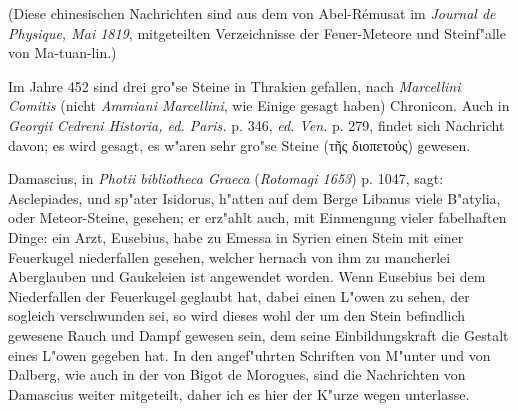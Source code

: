 \documentclass[a4paper, 11pt, oneside, polutonikogreek, german]{article}
\begin{document}
(Diese chinesischen Nachrichten sind aus dem von Abel-Rémusat im \emph{Journal de Physique, Mai 1819}, mitgeteilten Verzeichnisse der Feuer-Meteore und Steinf"alle von Ma-tuan-lin.)

Im Jahre 452 sind drei gro"se Steine in Thrakien gefallen, nach \emph{Marcellini Comitis} (nicht \emph{Ammiani Marcellini}, wie Einige gesagt haben) Chronicon. Auch in \emph{Georgii Cedreni Historia, ed. Paris.} p. 346, \emph{ed. Ven.} p. 279, findet sich Nachricht davon; es wird gesagt, es w"aren sehr gro"se Steine (τῆς διοπετοὑς) gewesen.

Damascius, in \emph{Photii bibliotheca Graeca} (\emph{Rotomagi 1653}) p. 1047, sagt: Asclepiades, und sp"ater Isidorus, h"atten auf dem Berge Libanus viele B"atylia, oder Meteor-Steine, gesehen; er erz"ahlt auch, mit Einmengung vieler fabelhaften Dinge: ein Arzt, Eusebius, habe zu Emessa in Syrien einen Stein mit einer Feuerkugel niederfallen gesehen, welcher hernach von ihm zu mancherlei Aberglauben und Gaukeleien ist angewendet worden. Wenn Eusebius bei dem Niederfallen der Feuerkugel geglaubt hat, dabei einen L"owen zu sehen, der sogleich verschwunden sei, so wird dieses wohl der um den Stein befindlich gewesene Rauch und Dampf gewesen sein, dem seine Einbildungskraft die Gestalt eines L"owen gegeben hat. In den angef"uhrten Schriften von M"unter und von Dalberg, wie auch in der von Bigot de Morogues, sind die Nachrichten von Damascius weiter mitgeteilt, daher ich es hier der K"urze wegen unterlasse.
\end{document}
